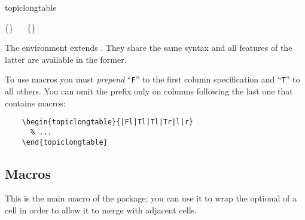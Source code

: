 \documentclass[full,kernel]{l3doc}
\begin{document}
\begin{documentation}
\begin{function}{topiclongtable}
  \begin{syntax}
    \{\}
    \ \ 
    \{\}
  \end{syntax}
  The  environment extends .
  They share the same syntax and all features of the latter are
  available in the former.

  To use  macros you must \emph{prepend} \enquote{\texttt{F}}
  to the first column specification and \enquote{\texttt{T}} to all others.  You
  can omit the prefix only on columns following the last one that contains
   macros:
  \begin{verbatim}
    \begin{topiclongtable}{|Fl|Tl|Tl|Tr|l|r}
      % ...
    \end{topiclongtable}
  \end{verbatim}
\end{function}\smallskip




\subsection*{Macros}

\begin{function}{\Topic}
  \begin{syntax}
  \end{syntax}
  This is the main macro of the package; you can use it to wrap the
  optional  of a cell in order to allow it to merge with
  adjacent cells.
\end{function}\smallskip


\end{documentation}
\end{document}
